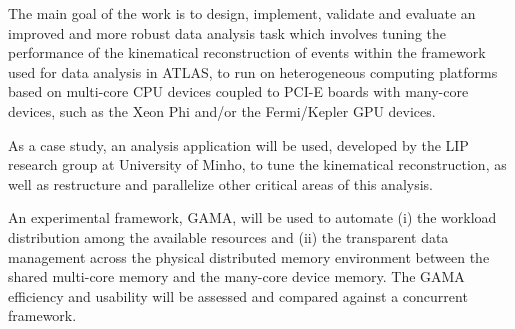 The main goal of the work is to design, implement, validate and evaluate an improved and more robust data analysis task which involves tuning the performance of the kinematical reconstruction of events within the framework used for data analysis in ATLAS, to run on heterogeneous computing platforms based on multi-core CPU devices coupled to PCI-E boards with many-core devices, such as the \intel Xeon Phi and/or the \nvidia Fermi/Kepler GPU devices.

As a case study, an analysis application will be used, developed by the LIP research group at University of Minho, to tune the kinematical reconstruction, as well as restructure and parallelize other critical areas of this analysis.

An experimental framework, GAMA, will be used to automate (i) the workload distribution among the available resources and (ii) the transparent data management across the physical distributed memory environment between the shared multi-core memory and the many-core device memory. The GAMA efficiency and usability will be assessed and compared against a concurrent framework.

\newpage
{}
